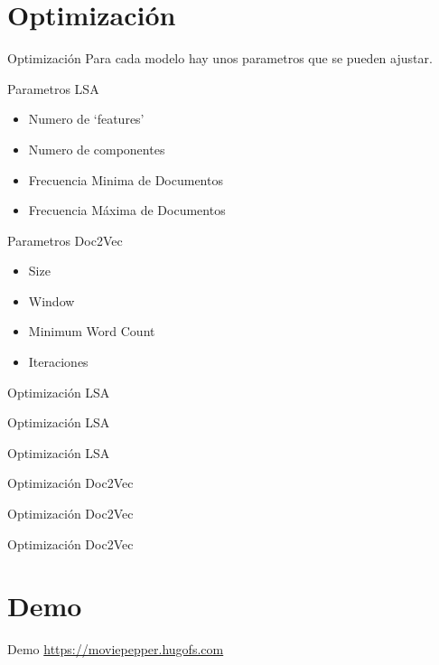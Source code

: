\documentclass{beamer}
\begin{document}
  \section{Optimización}
  \begin{frame}{Optimización}
      Para cada modelo hay unos parametros que se pueden ajustar.
  \end{frame}
  \begin{frame}{Parametros LSA}
      \begin{itemize}
          \item Numero de `features'
          \item Numero de componentes
          \item Frecuencia Minima de Documentos
          \item Frecuencia Máxima de Documentos
      \end{itemize}
  \end{frame}
  \begin{frame}{Parametros Doc2Vec}
      \begin{itemize}
          \item Size
          \item Window
          \item Minimum Word Count
          \item Iteraciones
      \end{itemize}
  \end{frame}
\newlength\figureheight
\newlength\figurewidth
\setlength{}
\setlength\figurewidth{\linewidth}
  \begin{frame}{Optimización LSA}
      \tiny
      \centering
      
  \end{frame}
  \begin{frame}{Optimización LSA}
      \tiny
      \centering
      
  \end{frame}
  \begin{frame}{Optimización LSA}
      \tiny
      \centering
      
  \end{frame}
  \begin{frame}{Optimización Doc2Vec}
      \tiny
      \centering
      
  \end{frame}
  \begin{frame}{Optimización Doc2Vec}
      \tiny
      \centering
      
  \end{frame}
  \begin{frame}{Optimización Doc2Vec}
      \tiny
      \centering
      
  \end{frame}
  \section{Demo}
  \begin{frame}{Demo}
      \url{https://moviepepper.hugofs.com}
  \end{frame}
\end{document}
